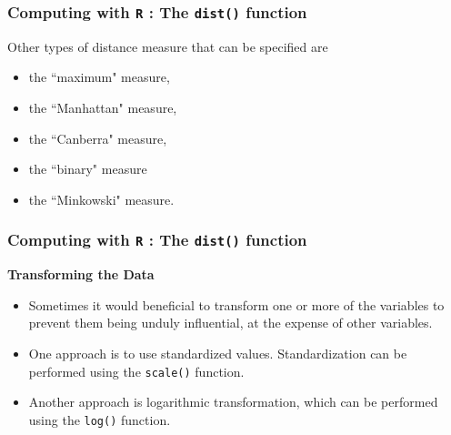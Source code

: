 \documentclass{beamer}
\begin{document}
\begin{frame}[fragile]
\frametitle{Computing with \texttt{R} : The \texttt{dist()} function}
\Large
\vspace{-1cm}
 Other types of distance measure that can be specified are
\begin{itemize}

\item the ``maximum" measure,\item the ``Manhattan" measure,\item the ``Canberra" measure,\item the ``binary" measure \item the ``Minkowski" measure.

\end{itemize}
\end{frame}
\begin{frame}[fragile]
\frametitle{Computing with \texttt{R} : The \texttt{dist()} function}
\Large
\textbf{Transforming the Data}
\begin{itemize}
\item Sometimes it would beneficial to transform one or more of the variables to prevent them being unduly influential, at the expense of other variables.
\item One approach is to use standardized values. Standardization can be performed using the \texttt{scale()} function.
\item Another approach is logarithmic transformation, which can be performed using the \texttt{log()} function.
\end{itemize}


\end{frame}
\end{document}
